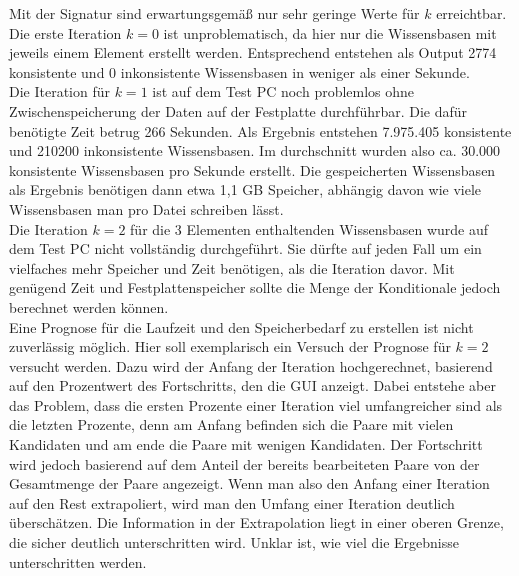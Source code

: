 \documentclass[12pt,a4paper]{article}
\begin{document}
Mit der Signatur sind erwartungsgemäß nur sehr geringe Werte für $k$ erreichtbar. Die erste Iteration $k=0$ ist unproblematisch, da hier nur die Wissensbasen mit jeweils einem Element erstellt werden. Entsprechend entstehen als Output 2774 konsistente und 0 inkonsistente Wissensbasen in weniger als einer Sekunde. \\
Die Iteration für $k = 1$ ist auf dem Test PC noch problemlos ohne Zwischenspeicherung der Daten auf der Festplatte durchführbar. Die dafür benötigte Zeit betrug 266 Sekunden. Als Ergebnis entstehen 7.975.405 konsistente und 210200 inkonsistente Wissensbasen. Im durchschnitt wurden also ca. 30.000 konsistente Wissensbasen pro Sekunde erstellt. Die gespeicherten Wissensbasen als Ergebnis benötigen dann etwa 1,1 GB Speicher, abhängig davon wie viele Wissensbasen man pro Datei schreiben lässt. \\
Die Iteration $k = 2$ für die 3 Elementen enthaltenden Wissensbasen wurde auf dem Test PC nicht vollständig durchgeführt. Sie dürfte auf jeden Fall um ein vielfaches mehr Speicher und Zeit benötigen, als die Iteration davor. Mit genügend Zeit und Festplattenspeicher sollte die Menge der Konditionale jedoch berechnet werden können. \\
Eine Prognose für die Laufzeit und den Speicherbedarf zu erstellen ist nicht zuverlässig möglich. Hier soll exemplarisch ein Versuch der Prognose für $k=2$ versucht werden. Dazu wird der Anfang der Iteration hochgerechnet, basierend auf den Prozentwert des Fortschritts, den die GUI anzeigt. Dabei entstehe aber das Problem, dass die ersten Prozente einer Iteration viel umfangreicher sind als die letzten Prozente, denn am Anfang befinden sich die Paare mit vielen Kandidaten und am ende die Paare mit wenigen Kandidaten. Der Fortschritt wird jedoch basierend auf dem Anteil der bereits bearbeiteten Paare von der Gesamtmenge der Paare angezeigt. Wenn man also den Anfang einer Iteration auf den Rest extrapoliert, wird man den Umfang einer Iteration deutlich überschätzen. Die Information in der Extrapolation liegt in einer oberen Grenze, die sicher deutlich unterschritten wird. Unklar ist, wie viel die Ergebnisse unterschritten werden. \\
\end{document}
